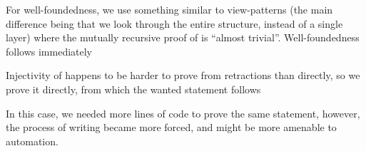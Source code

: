 For well-foundedness, we use something similar to view-patterns %
(the main difference being that we look through the entire structure, instead of a single layer)
where the mutually recursive proof of  is ``almost trivial''. Well-foundedness follows immediately

Injectivity of  happens to be harder to prove from retractions than directly, so we prove it directly, from which the wanted statement follows

In this case, we needed more lines of code to prove the same statement, however, the process of writing became more forced, and might be more amenable to automation.

